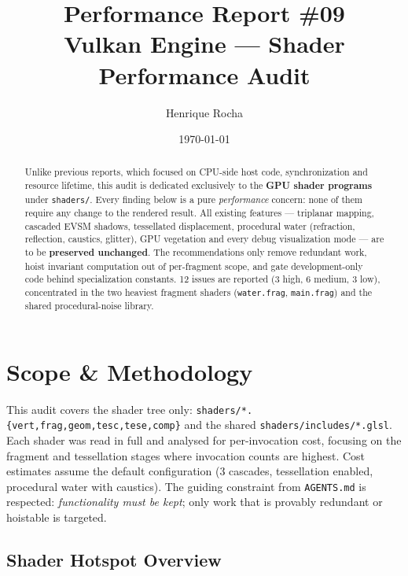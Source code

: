 \documentclass[a4paper,12pt]{article}
\title{\textbf{Performance Report \#09}\\[4pt]
\large Vulkan Engine — Shader Performance Audit}
\author{Henrique Rocha}
\date{\today}
\begin{document}
\maketitle

\begin{abstract}
Unlike previous reports, which focused on CPU-side host code, synchronization
and resource lifetime, this audit is dedicated exclusively to the
\textbf{GPU shader programs} under \texttt{shaders/}. Every finding below is a
pure \emph{performance} concern: none of them require any change to the
rendered result. All existing features — triplanar mapping, cascaded EVSM
shadows, tessellated displacement, procedural water (refraction, reflection,
caustics, glitter), GPU vegetation and every debug visualization mode — are to
be \textbf{preserved unchanged}. The recommendations only remove redundant work,
hoist invariant computation out of per-fragment scope, and gate
development-only code behind specialization constants. 12 issues are reported
(3 high, 6 medium, 3 low), concentrated in the two heaviest fragment shaders
(\texttt{water.frag}, \texttt{main.frag}) and the shared procedural-noise
library.
\end{abstract}

\tableofcontents
\newpage

\section{Scope \& Methodology}

This audit covers the shader tree only:
\texttt{shaders/*.\{vert,frag,geom,tesc,tese,comp\}} and the shared
\texttt{shaders/includes/*.glsl}. Each shader was read in full and analysed for
per-invocation cost, focusing on the fragment and tessellation stages where
invocation counts are highest. Cost estimates assume the default configuration
(3 cascades, tessellation enabled, procedural water with caustics). The guiding
constraint from \texttt{AGENTS.md} is respected: \emph{functionality must be
kept}; only work that is provably redundant or hoistable is targeted.

\subsection*{Shader Hotspot Overview}
\end{document}
